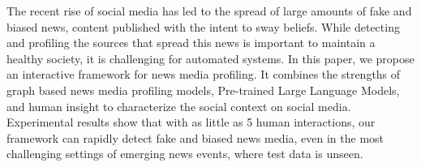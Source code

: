 The recent rise of social media has led to the spread of large amounts of fake and biased news, content published with the intent to sway beliefs. While detecting and profiling the sources that spread this news is important to maintain a healthy society, it is challenging for automated systems. In this paper, we propose an interactive framework for news media profiling. It combines the strengths of graph based news media profiling models, Pre-trained Large Language Models, and human insight to characterize the social context on social media. Experimental results show that with as little as 5 human interactions, our framework can rapidly detect fake and biased news media, even in the most challenging settings of emerging news events, where test data is unseen.